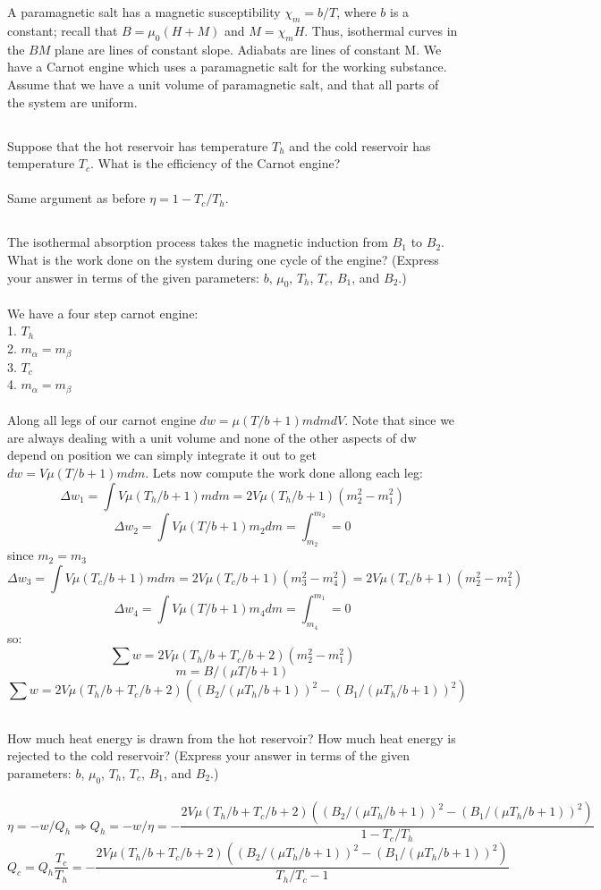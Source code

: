 \documentclass[10pt,a4paper]{article}
\begin{document}
\section{}
A paramagnetic salt has a magnetic susceptibility $\chi_m =b/T$, where $b$ is a constant; recall that $B = \mu_0(H + M)$ and $M = \chi_m H$. Thus, isothermal curves in the $BM$ plane are lines of constant slope. Adiabats are lines of constant M. We have a Carnot engine which uses a paramagnetic salt for the working substance. Assume that we have a unit volume of paramagnetic salt, and that all parts of the system are uniform.
\subsection{}
Suppose that the hot reservoir has temperature $T_h$ and the cold reservoir has temperature $T_c$. What is the efficiency of the Carnot engine?\\\\
Same argument as before $\eta=1-T_c/T_h$.
\subsection{}
The isothermal absorption process takes the magnetic induction from $B_1$ to $B_2$.  What is the work done on the system during one cycle of the engine? (Express your answer in terms of the given parameters: $b$, $\mu_0$, $T_h$, $T_c$, $B_1$, and $B_2$.)\\\\
We have a four step carnot engine:\\
1. $T_h$\\
2. $m_\alpha=m_\beta$\\
3. $T_c$\\
4. $m_\alpha=m_\beta$\\\\
Along all legs of our carnot engine $dw=\mu (T/b+1)mdmdV$.  Note that since we are always dealing with a unit volume and none of the other aspects of dw depend on position we can simply integrate it out to get $dw=V\mu (T/b+1)mdm$.  Lets now compute the work done allong each leg:
$$\Delta w_1=\int V\mu (T_h/b+1)mdm=2V\mu (T_h/b+1)(m_2^2-m_1^2)$$
$$\Delta w_2=\int V\mu (T/b+1)m_2dm=\int_{m_2}^{m_3}=0$$
since $m_2=m_3$
$$\Delta w_3=\int V\mu (T_c/b+1)mdm=2V\mu (T_c/b+1)(m_3^2-m_4^2)=2V\mu (T_c/b+1)(m_2^2-m_1^2)$$
$$\Delta w_4=\int V\mu (T/b+1)m_4dm=\int_{m_4}^{m_1}=0$$
so:
$$\sum w=2V\mu (T_h/b+T_c/b+2)(m_2^2-m_1^2)$$
$$m=B/(\mu T/b+1)$$
$$\sum w=2V\mu (T_h/b+T_c/b+2)((B_2/(\mu T_h/b+1))^2-(B_1/(\mu T_h/b+1))^2)$$
\subsection{}
How much heat energy is drawn from the hot reservoir? How much heat energy is rejected to the cold reservoir? (Express your answer in terms of the given parameters: $b$, $\mu_0$, $T_h$, $T_c$, $B_1$, and $B_2$.)\\\\
$$\eta=-w/Q_h\Rightarrow Q_h=-w/\eta=-\frac{2V\mu (T_h/b+T_c/b+2)((B_2/(\mu T_h/b+1))^2-(B_1/(\mu T_h/b+1))^2)}{1-T_c/T_h}$$
$$Q_c=Q_h\frac{T_c}{T_h}=-\frac{2V\mu (T_h/b+T_c/b+2)((B_2/(\mu T_h/b+1))^2-(B_1/(\mu T_h/b+1))^2)}{T_h/T_c-1}$$
\end{document}
